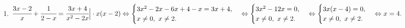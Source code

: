 1. $\cfrac{3x-2}{x}+\cfrac{1}{2-x}=\cfrac{3x+4}{x^2-2x}\Big|\cdot x(x-2)\Leftrightarrow
\begin{cases}
3x^2-2x-6x+4-x=3x+4,\\
x\neq0,\ x\neq 2.\end{cases}\Leftrightarrow\begin{cases}
3x^2-12x=0,\\
x\neq0,\ x\neq 2.\end{cases}\Leftrightarrow\begin{cases}
3x(x-4)=0,\\
x\neq0,\ x\neq 2.\end{cases}\Leftrightarrow x=4.$\\
